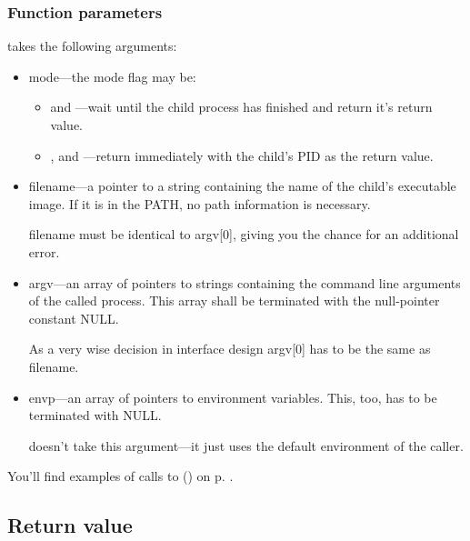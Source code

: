 \documentclass[11pt,a4paper]{article}%
\begin{document}
\subsubsection {Function parameters}
{\Tt{}} takes the following arguments:
\begin{itemize}
  \item{{\Tt{}mode}---the mode flag may be:
    \begin {itemize}
      \item{{\Tt{}} and {\Tt{}}---wait until the child
        process has finished and return it's return value.}
      \item{{\Tt{}}, {\Tt{}} and {\Tt{}}---return
        immediately with the child's PID as the return value.}
    \end {itemize}
  }
  \item{{\Tt{}filename}---a pointer to a string containing the name of
    the child's executable image. If it is in the PATH, no path 
    information is necessary.
    
    {\Tt{}filename} must be identical to {\Tt{}argv[0]}, giving you the chance
      for an additional error.}
  \item{{\Tt{}argv}---an array of pointers to strings containing the
    command line arguments of the called process. This array shall 
    be terminated with the null-pointer constant NULL.
    
    As a very wise decision in interface design {\Tt{}argv[0]} has to be
    the same as {\Tt{}filename}.}
  \item{{\Tt{}envp}---an array of pointers to environment variables. This, too,
    has to be terminated with NULL.
    
    {\Tt{}} doesn't take this argument---it just uses the default 
    environment of the caller.}
\end{itemize}

You'll find examples of calls to {\Tt{}()} on p. \pageref{test}. 

\subsection {Return value}
\end{document}
